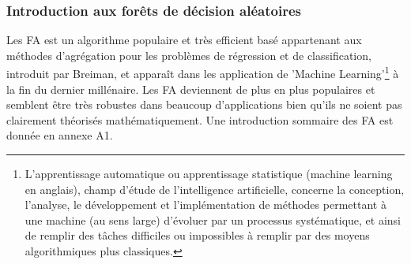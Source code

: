 	\subsubsection{Introduction aux forêts de décision aléatoires}
	Les FA est un algorithme populaire et très efficient basé appartenant aux méthodes d'agrégation pour les problèmes de régression et de classification, introduit par Breiman\cite{BREI01}, et apparaît dans les application de 'Machine Learning'\footnote{L'apprentissage automatique ou apprentissage statistique (machine learning en anglais), champ d'étude de l'intelligence artificielle, concerne la conception, l'analyse, le développement et l'implémentation de méthodes permettant à une machine (au sens large) d'évoluer par un processus systématique, et ainsi de remplir des tâches difficiles ou impossibles à remplir par des moyens algorithmiques plus classiques.} à la fin du dernier millénaire\cite{DITRI99}. Les FA deviennent de plus en plus populaires et semblent être très robustes dans beaucoup d'applications bien qu'ils ne soient pas clairement théorisés mathématiquement\cite{BIA08}. Une introduction sommaire des FA est donnée en annexe A1.
	\par

